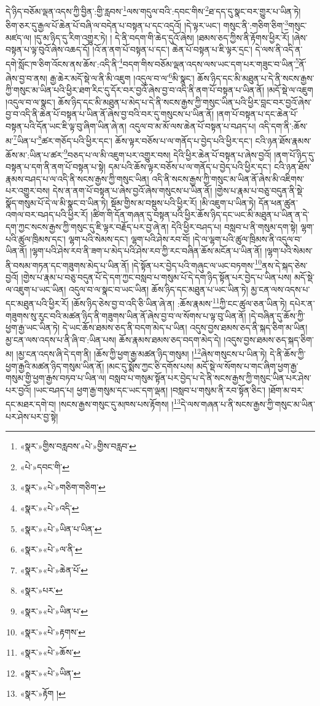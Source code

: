 དེ་ཉིད་བཅོམ་ལྡན་འདས་ཀྱི་བྱིན་:གྱི་རླབས་\footnote{«སྣར་»གྱིས་བརླབས་«པེ་»གྱིས་བརླབ་}ལས་གདུལ་བའི་:དབང་གིས་\footnote{«པེ་»དབང་གི་}ཐ་དད་དུ་སྣང་བར་གྱུར་པ་ཡིན་ཏེ། ཅིག་ཅར་དུ་རྒྱལ་པོ་ཆེན་པོ་བཞི་ལ་བདེན་པ་བསྟན་པ་དང་འདྲའོ། །དེ་ལྟར་ཡང་། གསུང་ནི་:གཅིག་ཅིག་\footnote{«སྣར་»«པེ་»གཅིག་གཅིག་}གསུང་མཛད་ལ། །དུ་མ་ཉིད་དུ་རིག་འགྱུར་ཏེ། །
དེ་ནི་བདག་གི་ཆེད་དུའོ་ཞེས། །ཐམས་ཅད་ཀྱིས་ནི་རྟོགས་ཕྱིར་རོ། །ཞེས་བསྟན་པ་ལྟ་བུའོ་ཞེས་འཆད་དོ། །འོ་ན་ནག་པོ་བསྟན་པ་དང་། ཆེན་པོ་བསྟན་པ་ཇི་ལྟར་དྲང་། དེ་ལས་ནི་འདི་ན་དགེ་སློང་ཁ་ཅིག་འོངས་ནས་ཆོས་:འདི་ནི་\footnote{«སྣར་»«པེ་»འདི་}བདག་གིས་བཅོམ་ལྡན་འདས་ལས་ཡང་དག་པར་གཟུང་བ་ཡིན་\footnote{«སྣར་»«པེ་»ཡིན་པ་ཡིན་}ནོ་ཞེས་བྱ་བ་ནས། རྒྱ་ཆེར་མདོ་སྡེ་ལ་ནི་མི་འཇུག །འདུལ་བ་ལ་\footnote{«སྣར་»«པེ་»ལ་ནི་}མི་སྣང་། ཆོས་ཉིད་དང་མི་མཐུན་པ་དེ་ནི་སངས་རྒྱས་ཀྱི་གསུང་མ་ཡིན་པའི་ཕྱིར་ཐག་རིང་དུ་དོར་བར་བྱའོ་ཞེས་བྱ་བ་འདི་ནི་ནག་པོ་བསྟན་པ་ཡིན་ནོ། །མདོ་སྡེ་ལ་འཇུག །འདུལ་བ་ལ་སྣང་། ཆོས་ཉིད་དང་མི་མཐུན་པ་མེད་པ་དེ་ནི་སངས་རྒྱས་ཀྱི་གསུང་ཡིན་པའི་ཕྱིར་བླང་བར་བྱའོ་ཞེས་བྱ་བ་འདི་ནི་ཆེན་པོ་བསྟན་པ་ཡིན་ནོ་ཞེས་བྱ་བའི་བར་དུ་གསུངས་པ་ཡིན་ནོ། །ནག་པོ་བསྟན་པ་དང་ཆེན་པོ་བསྟན་པའི་དོན་ཡང་ཇི་ལྟ་བུ་ཞིག་ཡིན་ཞེ་ན། འདུལ་བ་མ་མོ་ལས་ཆེན་པོ་བསྟན་པ་བཤད་པ། འདི་དག་ནི་:ཆོས་མ་\footnote{«སྣར་»«པེ་»ཆེན་པོ་}ཡིན་པ་\footnote{«སྣར་»པར་}ཚར་གཅོད་པའི་ཕྱིར་དང་། ཆོས་ལྟར་བཅོས་པ་ལ་གནོད་པ་བྱེད་པའི་ཕྱིར་དང་། ངའི་ཉན་ཐོས་རྣམས་ཆོས་མ་:ཡིན་པ་ཚར་\footnote{«སྣར་»«པེ་»ཡིན་པ་}བཅད་པ་ལ་མི་འཇུག་པར་འགྱུར་བས། དེའི་ཕྱིར་ཆེན་པོ་བསྟན་པ་ཞེས་བྱའོ། །ནག་པོ་ཉིད་དུ་བསྟན་པ་དག་ནི་ནག་པོ་བསྟན་པ་སྟེ། དམ་པའི་ཆོས་ལྟར་བཅོས་པ་ལ་གནོད་པ་བྱེད་པའི་ཕྱིར་དང་། ངའི་ཉན་ཐོས་རྣམས་བཤད་པ་ལ་འདི་ནི་སངས་རྒྱས་ཀྱི་གསུང་ཡིན། འདི་ནི་སངས་རྒྱས་ཀྱི་གསུང་མ་ཡིན་ནོ་ཞེས་མི་འཇིགས་པར་འགྱུར་བས། དེས་ན་ནག་པོ་བསྟན་པ་ཞེས་བྱའོ་ཞེས་གསུངས་པ་ཡིན་ནོ། །གྱེས་པ་རྣམ་པ་བཅུ་བདུན་ནི་སྡེ་སྣོད་གསུམ་པོ་དེ་ལ་མི་སྣང་བ་ཡིན་ཏེ། སྡོམ་གྱིས་མ་བསྡུས་པའི་ཕྱིར་རོ། །མི་འཇུག་པ་ཡིན་ཏེ། དོན་ཕན་ཚུན་འགལ་བར་བཤད་པའི་ཕྱིར་རོ། །ཚིག་གི་དོན་གཞན་དུ་བསྟན་པའི་ཕྱིར་ཆོས་ཉིད་དང་ཡང་མི་མཐུན་པ་ཡིན་ན་དེ་དག་ཀྱང་སངས་རྒྱས་ཀྱི་གསུང་དུ་ཇི་ལྟར་བརྗོད་པར་བྱ་ཞེ་ན། དེའི་ཕྱིར་བཤད་པ། བསླབ་པ་ནི་གསུམ་དག་སྟེ། ལྷག་པའི་ཚུལ་ཁྲིམས་དང་། ལྷག་པའི་སེམས་དང་། ལྷག་པའི་ཤེས་རབ་བོ། །དེ་ལ་ལྷག་པའི་ཚུལ་ཁྲིམས་ནི་འདུལ་བ་ཡིན་ནོ། །ལྷག་པའི་ཤེས་རབ་ནི་ཟག་པ་མེད་པའི་ཤེས་རབ་ཀྱི་རང་བཞིན་ཆོས་མངོན་པ་ཡིན་ནོ། །ལྷག་པའི་སེམས་ནི་བསམ་གཏན་དང་གཟུགས་མེད་པ་ཡིན་ནོ། །དེ་སྟོན་པར་བྱེད་པའི་གཞུང་ལ་ཡང་བཏགས་\footnote{«སྣར་»«པེ་»རྟགས་}ནས་དེ་སྐད་ཅེས་བྱའོ། །གྱེས་པ་རྣམ་པ་བཅུ་བདུན་པོ་དེ་དག་ཀྱང་བསླབ་པ་གསུམ་པོ་དེ་དག་ཉིད་སྟོན་པར་བྱེད་པ་ཡིན་པས། མདོ་སྡེ་ལ་འཇུག་པ་ཡང་ཡིན། འདུལ་བ་ལ་སྣང་བ་ཡང་ཡིན། ཆོས་ཉིད་དང་མཐུན་པ་ཡང་ཡིན་ཏེ། མྱ་ངན་ལས་འདས་པ་དང་མཐུན་པའི་ཕྱིར་རོ། །ཆོས་ཉིད་ཅེས་བྱ་བ་འདི་ཅི་ཡིན་ཞེ་ན། :ཆོས་རྣམས་\footnote{«སྣར་»«པེ་»ཆོས་}ཀྱི་ངང་ཚུལ་ཅན་ཡིན་ཏེ། དཔེར་ན་གཟུགས་སུ་རུང་བའི་མཚན་ཉིད་ནི་གཟུགས་ཡིན་ནོ་ཞེས་བྱ་བ་ལ་སོགས་པ་ལྟ་བུ་ཡིན་ནོ། །དེ་བཞིན་དུ་ཆོས་ཀྱི་ཕྱག་རྒྱ་ཡང་ཡིན་ཏེ། དེ་ཡང་ཆོས་ཐམས་ཅད་ནི་བདག་མེད་པ་ཡིན། འདུས་བྱས་ཐམས་ཅད་ནི་སྐད་ཅིག་མ་ཡིན། མྱ་ངན་ལས་འདས་པ་ནི་ཞི་བ་:ཡིན་པས། ཆོས་རྣམས་ཐམས་ཅད་བདག་མེད་དེ། །འདུས་བྱས་ཐམས་ཅད་སྐད་ཅིག་མ། །མྱ་ངན་འདས་ཞི་དེ་དག་ནི། །ཆོས་ཀྱི་ཕྱག་རྒྱ་མཚན་ཉིད་གསུམ། །\footnote{«སྣར་»«པེ་»ཡིན་}ཞེས་གསུངས་པ་ཡིན་ཏེ། དེ་ནི་ཆོས་ཀྱི་ཕྱག་རྒྱའི་མཚན་ཉིད་གསུམ་ཡིན་ནོ། །མང་དུ་སྨོས་ཀྱང་ཅི་དགོས་པས། མདོ་སྡེ་ལ་སོགས་པ་གང་ཞིག་ཕྱག་རྒྱ་གསུམ་གྱི་ཕྱག་རྒྱས་བཏབ་པ་ཡིན་ལ། བསླབ་པ་གསུམ་སྟོན་པར་བྱེད་པ་དེ་ནི་སངས་རྒྱས་ཀྱི་གསུང་ཡིན་པར་ཤེས་པར་བྱའོ། །ཡང་བཤད་པ། ཕྱག་རྒྱ་གསུམ་དང་ཡང་དག་ལྡན། །བསླབ་པ་གསུམ་ནི་རབ་སྟོན་ཅིང་། །ཐོག་མ་བར་དང་མཐར་དགེ་བ། །སངས་རྒྱས་གསུང་དུ་མཁས་པས་རྟོགས། །\footnote{«སྣར་»རྟོག །}དེ་ལས་གཞན་པ་ནི་སངས་རྒྱས་ཀྱི་གསུང་མ་ཡིན་པར་ཤེས་པར་བྱ་སྟེ། 